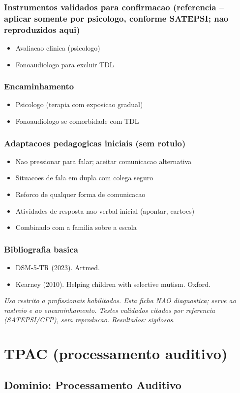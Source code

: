 \documentclass[a4paper,11pt]{book}
\newcommand{\avisolegal}{\par\medskip\noindent\footnotesize\itshape
\color{cinza}Uso restrito a profissionais habilitados. Esta ficha NAO diagnostica;
serve ao rastreio e ao encaminhamento. Testes validados citados por referencia
(SATEPSI/CFP), sem reproducao. Resultados: sigilosos.\color{black}\par}
\begin{document}
\subsection*{Instrumentos validados para confirmacao (referencia -- aplicar somente por psicologo, conforme SATEPSI; nao reproduzidos aqui)}
\begin{itemize}
\item Avaliacao clinica (psicologo)
\item Fonoaudiologo para excluir TDL
\end{itemize}
\subsection*{Encaminhamento}
\begin{itemize}
\item Psicologo (terapia com exposicao gradual)
\item Fonoaudiologo se comorbidade com TDL
\end{itemize}
\subsection*{Adaptacoes pedagogicas iniciais (sem rotulo)}
\begin{itemize}
\item Nao pressionar para falar; aceitar comunicacao alternativa
\item Situacoes de fala em dupla com colega seguro
\item Reforco de qualquer forma de comunicacao
\item Atividades de resposta nao-verbal inicial (apontar, cartoes)
\item Combinado com a familia sobre a escola
\end{itemize}
\subsection*{Bibliografia basica}
\begin{itemize}
\item DSM-5-TR (2023). Artmed.
\item Kearney (2010). Helping children with selective mutism. Oxford.
\end{itemize}
\avisolegal


\chapter{TPAC (processamento auditivo)}
\section*{Dominio: Processamento Auditivo}
\end{document}

